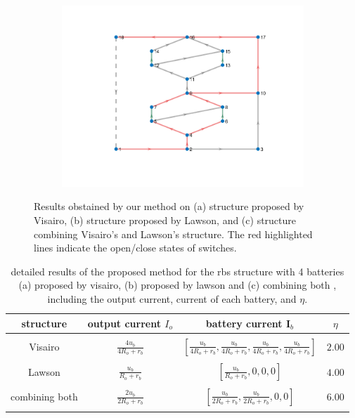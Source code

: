 \documentclass{article}
\begin{document}
\begin{figure}[htbp]
\begin{subfigure}[b]{0.45\textwidth}
    \includegraphics[width=\textwidth]{../attachments/e2f2-dege-mac.png}
    \caption{}
    \label{fig:d-structure-e2f2}
  \end{subfigure}
  \caption{Results obstained by our method on (a) structure proposed by Visairo\cite{visairoReconfigurableBatteryPack2008}, (b) structure proposed by Lawson\cite{lawsonSoftwareConfigurableBattery2012}, and (c) structure combining Visairo's and Lawson's structure. The red highlighted lines indicate the open/close states of switches.}
  \label{fig:d-structure}
\end{figure}


\begin{table}[h]
    \centering
    \caption{detailed results of the proposed method for the rbs structure with 4 batteries (a) proposed by visairo\cite{visairoReconfigurableBatteryPack2008}, (b) proposed by lawson\cite{lawsonSoftwareConfigurableBattery2012} and (c) combining both  , including the output current, current of each battery, and $\eta$.}
    \label{tab:d-structure}
    \begin{tabular}{cccc}
        \hline
        structure &  output current $I_o$       & battery current $\bm{I}_b$       & $\eta$        \\ 
        \hline\\
        Visairo\cite{visairoReconfigurableBatteryPack2008} &  $\displaystyle\frac{4u_b}{4R_o + r_b}$ &  $\displaystyle\left[\frac{u_b}{4R_o + r_b},\frac{u_b}{4R_o + r_b},\frac{u_b}{4R_o + r_b},\frac{u_b}{4R_o + r_b}\right]$   & $2.00$ \\ 
        \\
        Lawson\cite{lawsonSoftwareConfigurableBattery2012} &  $\displaystyle\frac{u_b}{R_o + r_b}$ &  $\displaystyle\left[\frac{u_b}{R_o + r_b},0,0,0\right]$   & $4.00$ \\ 
        \\ 
        combining both &  $\displaystyle\frac{2u_b}{2R_o + r_b}$ &  $\displaystyle\left[\frac{u_b}{2R_o + r_b},\frac{u_b}{2R_o + r_b},0,0\right]$   & $6.00$ \\ 
        \\
        \hline
    \end{tabular}
\end{table}
\end{document}
